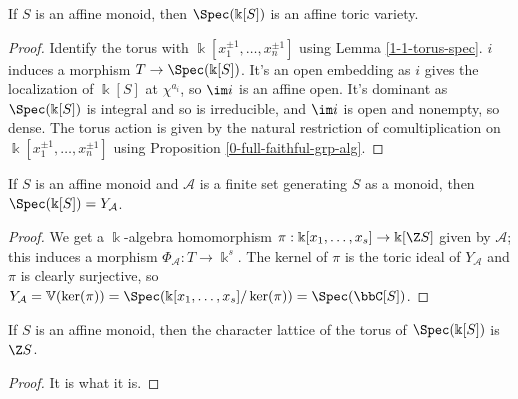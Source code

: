\begin{proposition}
  \label{1-1-14-aff-tor-var-spec-aff-mon-alg}
  \leanok

  If $S$ is an affine monoid, then $\Spec(\Bbbk[S])$ is an affine toric variety.
\end{proposition}
\begin{proof}

  Identify the torus with $\Bbbk[x_1^{\pm1}, \dotsc, x_n^{\pm1}]$ using Lemma \ref{1-1-torus-spec}.
  $i$ induces a morphism $T \to \Spec(\Bbbk[S])$. It's an open embedding as $i$ gives the localization of $\Bbbk[S]$ at $\chi^{a_i}$, so $\im i$ is an affine open. It's dominant as $\Spec(\Bbbk[S])$ is integral and so is irreducible, and $\im i$ is open and nonempty, so dense. The torus action is given by the natural restriction of comultiplication on $\Bbbk[x_1^{\pm1}, \dotsc, x_n^{\pm1}]$ using Proposition \ref{0-full-faithful-grp-alg}.
\end{proof}


\begin{proposition}
  \label{1-1-14-spec-aff-mon-alg-eq-ya}

  If $S$ is an affine monoid and $\mathcal A$ is a finite set generating $S$ as a monoid, then $\Spec(\Bbbk[S]) = Y_{\mathcal A}$.
\end{proposition}
\begin{proof}

  We get a $\Bbbk$-algebra homomorphism $\pi : \Bbbk[x_1, \dotsc, x_s] \to \Bbbk[\Z S]$ given by $\mathcal A$; this induces a morphism $\Phi_{\mathcal A} : T \to \Bbbk^s$. The kernel of $\pi$ is the toric ideal of $Y_{\mathcal A}$ and $\pi$ is clearly surjective, so $Y_{\mathcal A} = \mathbb V(\ker(\pi)) = \Spec(\Bbbk[x_1, \dotsc, x_s] / \ker(\pi)) = \Spec(\bbC[S])$.
\end{proof}


\begin{proposition}
  \label{1-1-14-char-spec-aff-mon-alg}

  If $S$ is an affine monoid, then the character lattice of the torus of $\Spec(\Bbbk[S])$ is $\Z S$.
\end{proposition}
\begin{proof}

  It is what it is.
\end{proof}


